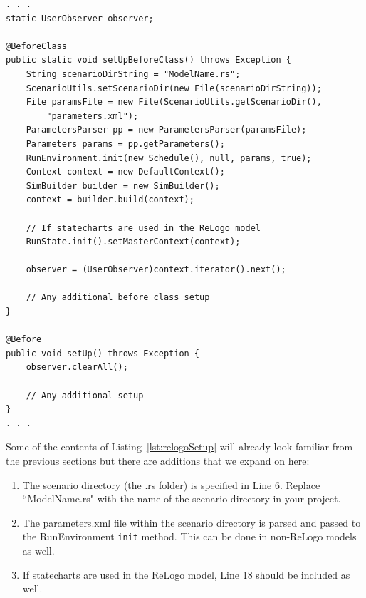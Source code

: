 \documentclass[11pt]{amsart}
\begin{document}
\noindent\begin{minipage}[h]{\textwidth}
\vspace{.2in}
\lstset{language=java,caption=@Setup method in a schedule dependent test case.,label=lst:relogoSetup}
\begin{lstlisting}
. . .
static UserObserver observer;

@BeforeClass
public static void setUpBeforeClass() throws Exception {
	String scenarioDirString = "ModelName.rs";
	ScenarioUtils.setScenarioDir(new File(scenarioDirString));
	File paramsFile = new File(ScenarioUtils.getScenarioDir(),
		"parameters.xml");
	ParametersParser pp = new ParametersParser(paramsFile);
	Parameters params = pp.getParameters();
	RunEnvironment.init(new Schedule(), null, params, true);
	Context context = new DefaultContext();
	SimBuilder builder = new SimBuilder();
	context = builder.build(context);
	
	// If statecharts are used in the ReLogo model
	RunState.init().setMasterContext(context);
	
	observer = (UserObserver)context.iterator().next();
	
	// Any additional before class setup
}

@Before
public void setUp() throws Exception {
	observer.clearAll();

	// Any additional setup
}
. . .
\end{lstlisting}
\vspace{.2in}
\end{minipage}
Some of the contents of Listing~\ref{lst:relogoSetup} will already look familiar from the previous sections but there are additions that we expand on here:
\begin{enumerate}
\item
The scenario directory (the .rs folder) is specified in Line 6. Replace ``ModelName.rs" with the name of the scenario directory in your project.
\item
The parameters.xml file within the scenario directory is parsed and passed to the RunEnvironment \texttt{init} method. This can be done in non-ReLogo models as well.
\item
If statecharts are used in the ReLogo model, Line 18 should be included as well.
\end{enumerate}
%
%
%
\end{document}
